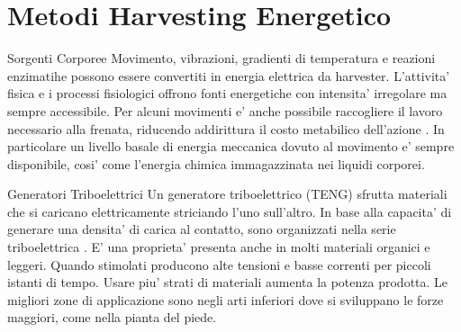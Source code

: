 \chapter{Metodi Harvesting Energetico}
\begin{multicols}{2}

\begin{section}{Sorgenti Corporee}
   Movimento, vibrazioni, gradienti di temperatura e reazioni enzimatihe possono essere convertiti in energia elettrica da harvester. L'attivita' fisica e i processi fisiologici offrono fonti energetiche con intensita' irregolare ma sempre accessibile. Per alcuni movimenti e' anche possibile raccogliere il lavoro necessario alla frenata, riducendo addirittura il costo metabilico dell'azione \cite{liuBiomechanicalEnergyHarvesting2022}. In particolare un livello basale di energia meccanica dovuto al movimento e' sempre disponibile, cosi' come l'energia chimica immagazzinata nei liquidi corporei.
   
   \begin{subsection}{Generatori Triboelettrici}
    Un generatore triboelettrico (TENG) sfrutta materiali che si caricano elettricamente striciando l'uno sull'altro. In base alla capacita' di generare una densita' di carica al contatto, sono organizzati nella serie triboelettrica \cite{zouQuantifyingTriboelectricSeries2019}. E' una proprieta' presenta anche in molti materiali organici e leggeri. Quando stimolati producono alte tensioni e basse correnti per piccoli istanti di tempo. Usare piu' strati di materiali aumenta la potenza prodotta. Le migliori zone di applicazione sono negli arti inferiori dove si sviluppano le forze maggiori, come nella pianta del piede.
   \end{subsection}


\end{section}
\end{multicols}
